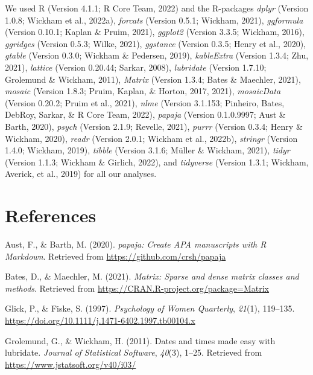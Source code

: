 \documentclass[
  english,
  man,floatsintext]{apa6}
\begin{document}
We used R (Version 4.1.1; R Core Team, 2022) and the R-packages \emph{dplyr} (Version 1.0.8; Wickham et al., 2022a), \emph{forcats} (Version 0.5.1; Wickham, 2021), \emph{ggformula} (Version 0.10.1; Kaplan \& Pruim, 2021), \emph{ggplot2} (Version 3.3.5; Wickham, 2016), \emph{ggridges} (Version 0.5.3; Wilke, 2021), \emph{ggstance} (Version 0.3.5; Henry et al., 2020), \emph{gtable} (Version 0.3.0; Wickham \& Pedersen, 2019), \emph{kableExtra} (Version 1.3.4; Zhu, 2021), \emph{lattice} (Version 0.20.44; Sarkar, 2008), \emph{lubridate} (Version 1.7.10; Grolemund \& Wickham, 2011), \emph{Matrix} (Version 1.3.4; Bates \& Maechler, 2021), \emph{mosaic} (Version 1.8.3; Pruim, Kaplan, \& Horton, 2017, 2021), \emph{mosaicData} (Version 0.20.2; Pruim et al., 2021), \emph{nlme} (Version 3.1.153; Pinheiro, Bates, DebRoy, Sarkar, \& R Core Team, 2022), \emph{papaja} (Version 0.1.0.9997; Aust \& Barth, 2020), \emph{psych} (Version 2.1.9; Revelle, 2021), \emph{purrr} (Version 0.3.4; Henry \& Wickham, 2020), \emph{readr} (Version 2.0.1; Wickham et al., 2022b), \emph{stringr} (Version 1.4.0; Wickham, 2019), \emph{tibble} (Version 3.1.6; Müller \& Wickham, 2021), \emph{tidyr} (Version 1.1.3; Wickham \& Girlich, 2022), and \emph{tidyverse} (Version 1.3.1; Wickham, Averick, et al., 2019) for all our analyses.

\newpage

\hypertarget{references}{%
\section{References}\label{references}}

\begingroup
\setlength{\parindent}{-0.5in}
\setlength{\leftskip}{0.5in}

\hypertarget{refs}{}
\leavevmode\hypertarget{ref-R-papaja}{}%
Aust, F., \& Barth, M. (2020). \emph{papaja: Create APA manuscripts with R Markdown}. Retrieved from \url{https://github.com/crsh/papaja}

\leavevmode\hypertarget{ref-R-Matrix}{}%
Bates, D., \& Maechler, M. (2021). \emph{Matrix: Sparse and dense matrix classes and methods}. Retrieved from \url{https://CRAN.R-project.org/package=Matrix}

\leavevmode\hypertarget{ref-ASI}{}%
Glick, P., \& Fiske, S. (1997). \emph{Psychology of Women Quarterly}, \emph{21}(1), 119--135. \url{https://doi.org/10.1111/j.1471-6402.1997.tb00104.x}

\leavevmode\hypertarget{ref-R-lubridate}{}%
Grolemund, G., \& Wickham, H. (2011). Dates and times made easy with lubridate. \emph{Journal of Statistical Software}, \emph{40}(3), 1--25. Retrieved from \url{https://www.jstatsoft.org/v40/i03/}
\end{document}
